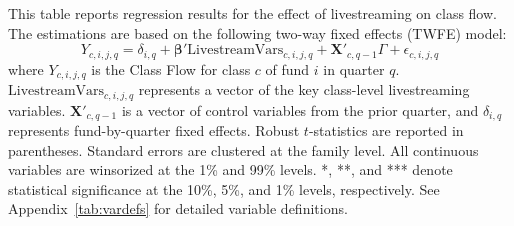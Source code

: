 \begin{table}[!ht]
    \centering
    
    \caption{Within-Fund Analysis of Livestreaming Effects}\label{tab:class_within_fund_test}
    
    \begin{minipage}{0.95\textwidth}
        \footnotesize
        This table reports regression results for the effect of livestreaming on class flow. The estimations are based on the following two-way fixed effects (TWFE) model:
        \begin{equation*}
            Y_{c,i,j,q} = \delta_{i,q} + \boldsymbol{\beta}' \text{LivestreamVars}_{c,i,j,q} + \mathbf{X}'_{c,q-1} \Gamma + \epsilon_{c,i,j,q}
        \end{equation*}
        where $Y_{c,i,j,q}$ is the Class Flow for class $c$ of fund $i$ in quarter $q$. $\text{LivestreamVars}_{c,i,j,q}$ represents a vector of the key class-level livestreaming variables. $\mathbf{X}'_{c,q-1}$ is a vector of control variables from the prior quarter, and $\delta_{i,q}$ represents fund-by-quarter fixed effects. Robust $t$-statistics are reported in parentheses. Standard errors are clustered at the family level. All continuous variables are winsorized at the 1\% and 99\% levels. *, **, and *** denote statistical significance at the 10\%, 5\%, and 1\% levels, respectively. See Appendix~\ref{tab:vardefs} for detailed variable definitions.
    \end{minipage}

    \vspace{2mm}
    
    \fontsize{12}{13}\selectfont
     

\end{table}